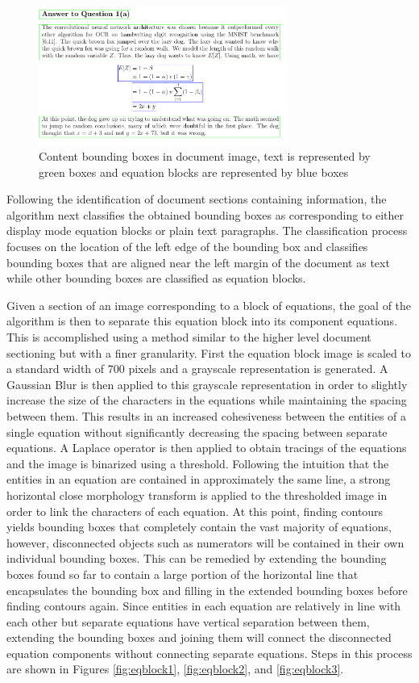 \documentclass[12pt]{IEEEtran}
\begin{document}
\begin{figure}[h]
  \centering
    \includegraphics[width=3.2in]{paper1-bounds.png}
  \caption{Content bounding boxes in document image, text is represented by green boxes and equation blocks are represented by blue boxes}
  \label{fig:paper3}
\end{figure}

Following the identification of document sections containing information, the algorithm next classifies the obtained bounding boxes as corresponding to either display mode equation blocks or plain text paragraphs. The classification process focuses on the location of the left edge of the bounding box and classifies bounding boxes that are aligned near the left margin of the document as text while other bounding boxes are classified as equation blocks.

Given a section of an image corresponding to a block of equations, the goal of the algorithm is then to separate this equation block into its component equations. This is accomplished using a method similar to the higher level document sectioning but with a finer granularity. First the equation block image is scaled to a standard width of 700 pixels and a grayscale representation is generated. A Gaussian Blur is then applied to this grayscale representation in order to slightly increase the size of the characters in the equations while maintaining the spacing between them. This results in an increased cohesiveness between the entities of a single equation without significantly decreasing the spacing between separate equations. A Laplace operator is then applied to obtain tracings of the equations and the image is binarized using a threshold. Following the intuition that the entities in an equation are contained in approximately the same line, a strong horizontal close morphology transform is applied to the thresholded image in order to link the characters of each equation. At this point, finding contours yields bounding boxes that completely contain the vast majority of equations, however, disconnected objects such as numerators will be contained in their own individual bounding boxes. This can be remedied by extending the bounding boxes found so far to contain a large portion of the horizontal line that encapsulates the bounding box and filling in the extended bounding boxes before finding contours again. Since entities in each equation are relatively in line with each other but separate equations have vertical separation between them, extending the bounding boxes and joining them will connect the disconnected equation components without connecting separate equations. Steps in this process are shown in Figures \ref{fig:eqblock1}, \ref{fig:eqblock2}, and \ref{fig:eqblock3}.
\end{document}
